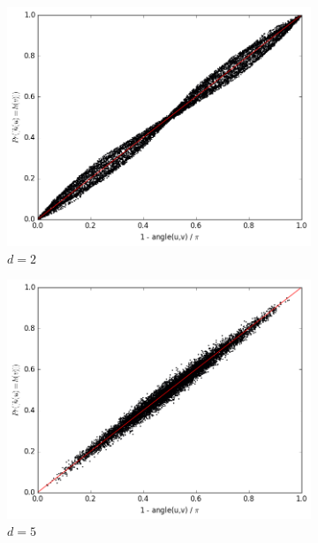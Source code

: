 \documentclass{ethz_report}
\begin{document}
\begin{figure}[h]
\centering
\begin{subfigure}[b]{.5\textwidth}
    \includegraphics[width=1\linewidth]{../code/simulation_vs_similarity_2.png}
    \caption{$d = 2$}
\end{subfigure}%
\begin{subfigure}[b]{.5\textwidth}
    \includegraphics[width=1\linewidth]{../code/simulation_vs_similarity_5.png}
    \caption{$d = 5$}
\end{subfigure}
\begin{subfigure}[b]{.5\textwidth}

\end{subfigure}
\end{figure}
\end{document}
